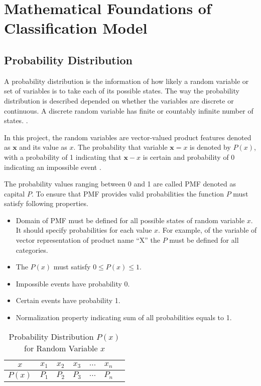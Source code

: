 \chapter{Mathematical Foundations of Classification Model}



\section{Probability Distribution}

A probability distribution is the information of how likely a random variable or set of variables is to take each of its possible states. The way the probability distribution is described depended on whether the variables are discrete or continuous. A discrete random variable has finite or countably infinite number of states. \parencite[Page 54]{Goodfellow-et-al-2016}.  

In this project, the random variables are vector-valued product features denoted as $ \textbf{x} $ and its value as $ x $. The probability that variable $\textbf{x} = x$ is denoted by $ P(x) $, with a probability of 1 indicating that $\textbf{x}-x$ is certain and probability of 0 indicating an impossible event \parencite[Page 55]{Goodfellow-et-al-2016}.


The probability values ranging between 0  and 1 are called \acf{PMF} denoted as capital $ P $. To ensure that \acs*{PMF} provides valid probabilities the function $P$ must satisfy following properties.


\begin{itemize}
    \item Domain of PMF must be defined for all possible states of random variable $x$. It should specify probabilities for each value $x$. For example, of the variable of vector representation of product name ``X'' the $P$ must be defined for all categories.
    \item The $ P(x) $ must satisfy $0 \leq  P(x) \leq  1$.
    \item Impossible events have probability 0.
    \item Certain events have probability 1.
    \item Normalization property indicating sum of all probabilities equals to 1.
\end{itemize}


\begin{table}[H]
    \centering
    \begin{tabular}{ccccccc}
        \hline
        $x$ & $x_1$ & $x_2$ & $x_3$ & $\dots$ & $x_n$ \\
        \hline
        $P(x)$ & $P_1$ & $P_2$ & $P_3$ & $\dots$ & $P_n$ \\
        \hline
    \end{tabular}
    \caption{Probability Distribution $P(x)$ for Random Variable $x$}
    \label{tab:probability-distribution}
\end{table}


